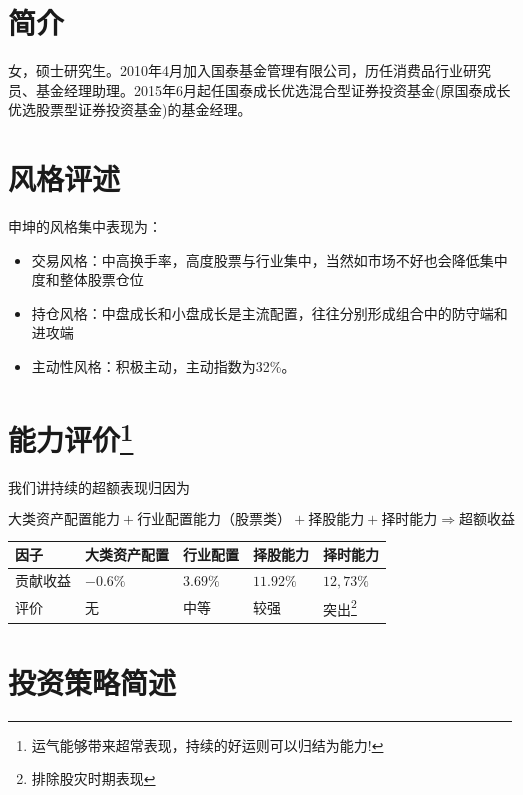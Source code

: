 \documentclass[journal=jacsat,manuscript=article]{achemso}
\begin{document}
\section{简介}

女，硕士研究生。2010年4月加入国泰基金管理有限公司，历任消费品行业研究员、基金经理助理。2015年6月起任国泰成长优选混合型证券投资基金(原国泰成长优选股票型证券投资基金)的基金经理。

\section{风格评述}

申坤的风格集中表现为：

\begin{itemize}
\item 交易风格：中高换手率，高度股票与行业集中，当然如市场不好也会降低集中度和整体股票仓位
\item 持仓风格：中盘成长和小盘成长是主流配置，往往分别形成组合中的防守端和进攻端
\item 主动性风格：积极主动，主动指数为32\%。
\end{itemize}

\section{\texorpdfstring{能力评价\footnote{运气能够带来超常表现，持续的好运则可以归结为能力!}}{能力评价}}

我们讲持续的超额表现归因为

\begin{equation}
\mbox{大类资产配置能力} + \mbox{行业配置能力（股票类）}+ \mbox{择股能力} + \mbox{择时能力} \Rightarrow \mbox{超额收益}
\end{equation}

\begin{table}
  \begin{tabular}{l|llll}
    因子 &大类资产配置  & 行业配置  & 择股能力 & 择时能力  \\ \hline
    贡献收益 & $-0.6\%$   & $3.69\%$ & $11.92\%$ &  $12,73\%$  \\
    评价 & 无 & 中等 & 较强 & 突出\footnote{排除股灾时期表现}  \\ \hline
  \end{tabular}
\end{table}

\section{投资策略简述}
\end{document}
